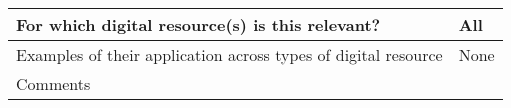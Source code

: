 \documentclass[english]{article}
\begin{document}
\begin{longtable}{|p{5cm}|p{9cm}|}
\\



\hline
For which digital resource(s) is this relevant? &  All\\



\hline
Examples of their application across types of digital resource &  None

\\



\hline

Comments & 


\\
\hline

\end{longtable}
\end{document}
